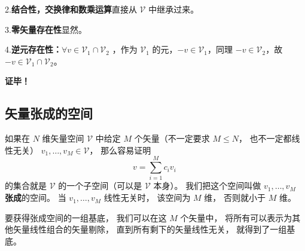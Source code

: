 2.\textbf{结合性，交换律和数乘运算}直接从 $\mathcal V$ 中继承过来。

3.\textbf{零矢量存在性}显然。

4.\textbf{逆元存在性：}$\forall v\in\mathcal V_1\cap\mathcal V_2$ ，作为 $\mathcal V_1$ 的元，$-v\in \mathcal V_1$，同理 $-v\in\mathcal V_2$，故 $-v\in\mathcal V_1\cap\mathcal V_2$。

\textbf{证毕！}


\subsection{矢量张成的空间}
如果在 $N$ 维矢量空间 $\mathcal V$ 中给定 $M$ 个矢量（不一定要求 $M \leqslant N$， 也不一定都线性无关） ${v_1}, \dots, {v_M} \in \mathcal V$， 那么容易证明
\begin{equation}
{v} = \sum_{i=1}^M c_i {v_i}~
\end{equation}
的集合就是 $\mathcal V$ 的一个子空间（可以是 $\mathcal V$ 本身）。 我们把这个空间叫做 ${v_1}, \dots, {v_M}$ \textbf{张成}的空间。 当 ${v_1}, \dots, {v_M}$ 线性无关时， 该空间为 $M$ 维， 否则就小于 $M$ 维。

要获得张成空间的一组基底， 我们可以在这 $M$ 个矢量中， 将所有可以表示为其他矢量线性组合的矢量剔除， 直到所有剩下的矢量线性无关， 就得到了一组基底。
